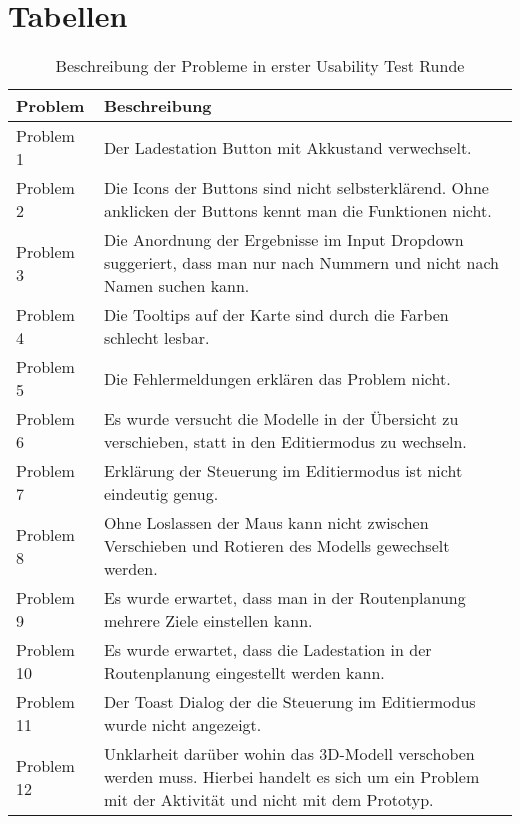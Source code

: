 \section{Tabellen}
\begin{table}[H]
    \caption{Beschreibung der Probleme in erster Usability Test Runde}\label{tbl:1stUsabilityTestsProblemsDesc}
    \begin{tabular}{|l|l|} \hline
        Problem     & Beschreibung \\ \hline
        Problem 1   & \multicolumn{1}{p{12cm}|}{Der Ladestation Button mit Akkustand verwechselt.} \\ \hline
        Problem 2   & \multicolumn{1}{p{12cm}|}{Die Icons der Buttons sind nicht selbsterklärend. Ohne anklicken der Buttons kennt man die Funktionen nicht.} \\ \hline
        Problem 3   & \multicolumn{1}{p{12cm}|}{Die Anordnung der Ergebnisse im Input Dropdown suggeriert, dass man nur nach Nummern und nicht nach Namen suchen kann.} \\ \hline
        Problem 4   & \multicolumn{1}{p{12cm}|}{Die Tooltips auf der Karte sind durch die Farben schlecht lesbar.} \\ \hline
        Problem 5   & \multicolumn{1}{p{12cm}|}{Die Fehlermeldungen erklären das Problem nicht.} \\ \hline
        Problem 6   & \multicolumn{1}{p{12cm}|}{Es wurde versucht die Modelle in der Übersicht zu verschieben, statt in den Editiermodus zu wechseln.} \\ \hline
        Problem 7   & \multicolumn{1}{p{12cm}|}{Erklärung der Steuerung im Editiermodus ist nicht eindeutig genug.} \\ \hline
        Problem 8   & \multicolumn{1}{p{12cm}|}{Ohne Loslassen der Maus kann nicht zwischen Verschieben und Rotieren des Modells gewechselt werden.} \\ \hline
        Problem 9   & \multicolumn{1}{p{12cm}|}{Es wurde erwartet, dass man in der Routenplanung mehrere Ziele einstellen kann.} \\ \hline
        Problem 10  & \multicolumn{1}{p{12cm}|}{Es wurde erwartet, dass die Ladestation in der Routenplanung eingestellt werden kann.} \\ \hline
        Problem 11  & \multicolumn{1}{p{12cm}|}{Der Toast Dialog der die Steuerung im Editiermodus wurde nicht angezeigt.} \\ \hline
        Problem 12  & \multicolumn{1}{p{12cm}|}{Unklarheit darüber wohin das 3D-Modell verschoben werden muss. Hierbei handelt es sich um ein Problem mit der Aktivität und nicht mit dem Prototyp.} \\ \hline

\end{tabular}
\end{table}
